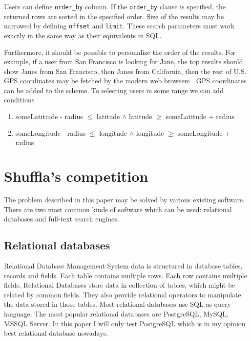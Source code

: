 \documentclass[10pt,a4paper]{article}
\begin{document}
Users can define \verb|order_by| column. If the \verb|order_by| clause is specified, the returned rows are sorted in the specified order. Size of the results may be narrowed by defining \verb|offset| and \verb|limit|. These search parameters must work exactly in the same way as their equivalents in SQL.

Furthermore, it should be possible to personalize the order of the results. For example, if a user from San Francisco is looking for Jane, the top results should show Janes from San Francisco, then Janes from California, then the rest of U.S. GPS coordinates may be fetched by the modern web browsers \cite{FETCHGPS}. GPS coordinates can be added to the scheme. To selecting users in some range we can add conditions   
\begin{enumerate}
\item{someLatitiude - radius $\leq$ latitude $\wedge$ latitude $\geq$ someLatitude + radius}
\item{someLongitude - radius $\leq$ longitude $\wedge$ longitude $\geq$ someLongitude + radius}
\end{enumerate}

\section{Shuffla's competition}
The problem described in this paper may be solved by various existing software. There are two most common kinds of software which can be used: relational databases and full-text search engines.

\subsection{Relational databases}
Relational Database Management System data is structured in database tables, records and fields. Each table contains multiple rows. Each row contains multiple fields. Relational Databases store data in collection of tables, which might be related by common fields. They also provide relational operators to manipulate the data stored in those tables. Most relational databases use SQL as query language. The most popular relational databases are PostgreSQL, MySQL, MSSQL Server. In this paper I will only test PostgreSQL which is in my opinion best relational database nowadays.
\end{document}
